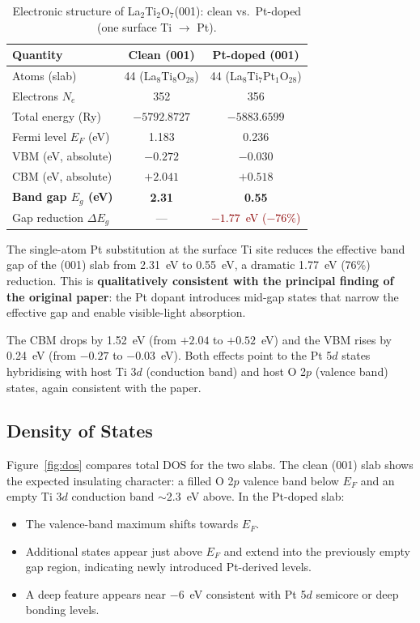 \documentclass[11pt]{article}
\begin{document}
\begin{table}[H]
\centering
\caption{Electronic structure of La$_2$Ti$_2$O$_7$(001): clean vs.\ Pt-doped (one surface Ti $\to$ Pt).}
\begin{tabular}{lcc}
\toprule
Quantity & Clean (001) & Pt-doped (001) \\
\midrule
Atoms (slab) & 44 (La$_8$Ti$_8$O$_{28}$) & 44 (La$_8$Ti$_7$Pt$_1$O$_{28}$) \\
Electrons $N_e$ & 352 & 356 \\
Total energy (Ry) & $-5792.8727$ & $-5883.6599$ \\
Fermi level $E_F$ (eV) & 1.183 & 0.236 \\
VBM (eV, absolute) & $-0.272$ & $-0.030$ \\
CBM (eV, absolute) & $+2.041$ & $+0.518$ \\
\textbf{Band gap $E_g$ (eV)} & \textbf{2.31} & \textbf{0.55} \\
Gap reduction $\Delta E_g$ & --- & \textcolor{darkred}{$-1.77$~eV ($-76\%$)} \\
\bottomrule
\end{tabular}
\end{table}

The single-atom Pt substitution at the surface Ti site reduces the
effective band gap of the (001) slab from 2.31~eV to 0.55~eV, a
dramatic 1.77~eV (76\%) reduction. This is \textbf{qualitatively
consistent with the principal finding of the original paper}: the Pt
dopant introduces mid-gap states that narrow the effective gap and
enable visible-light absorption.

The CBM drops by 1.52~eV (from $+2.04$ to $+0.52$~eV) and the VBM
rises by 0.24~eV (from $-0.27$ to $-0.03$~eV). Both effects point to
the Pt 5$d$ states hybridising with host Ti 3$d$ (conduction band) and
host O 2$p$ (valence band) states, again consistent with the paper.

\subsection{Density of States}

Figure~\ref{fig:dos} compares total DOS for the two slabs. The clean
(001) slab shows the expected insulating character: a filled O 2$p$
valence band below $E_F$ and an empty Ti 3$d$ conduction band
$\sim$2.3~eV above. In the Pt-doped slab:
\begin{itemize}[leftmargin=*]
    \item The valence-band maximum shifts towards $E_F$.
    \item Additional states appear just above $E_F$ and extend into
    the previously empty gap region, indicating newly introduced
    Pt-derived levels.
    \item A deep feature appears near $-6$~eV consistent with Pt 5$d$
    semicore or deep bonding levels.
\end{itemize}
\end{document}
